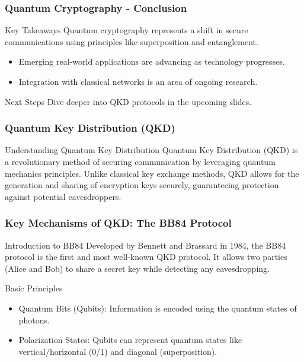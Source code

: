 \documentclass{beamer}
\begin{document}
\begin{frame}[fragile]
    \frametitle{Quantum Cryptography - Conclusion}
    \begin{block}{Key Takeaways}
        Quantum cryptography represents a shift in secure communications using principles like superposition and entanglement.
        \begin{itemize}
            \item Emerging real-world applications are advancing as technology progresses.
            \item Integration with classical networks is an area of ongoing research.
        \end{itemize}
    \end{block}
    \begin{block}{Next Steps}
        Dive deeper into QKD protocols in the upcoming slides.
    \end{block}
\end{frame}

\begin{frame}[fragile]
    \frametitle{Quantum Key Distribution (QKD)}
    \begin{block}{Understanding Quantum Key Distribution}
        Quantum Key Distribution (QKD) is a revolutionary method of securing communication by leveraging quantum mechanics principles. Unlike classical key exchange methods, QKD allows for the generation and sharing of encryption keys securely, guaranteeing protection against potential eavesdroppers.
    \end{block}
\end{frame}

\begin{frame}[fragile]
    \frametitle{Key Mechanisms of QKD: The BB84 Protocol}
    \begin{block}{Introduction to BB84}
        Developed by Bennett and Brassard in 1984, the BB84 protocol is the first and most well-known QKD protocol. It allows two parties (Alice and Bob) to share a secret key while detecting any eavesdropping.
    \end{block}
    
    \begin{block}{Basic Principles}
        \begin{itemize}
            \item Quantum Bits (Qubits): Information is encoded using the quantum states of photons.
            \item Polarization States: Qubits can represent quantum states like vertical/horizontal (0/1) and diagonal (superposition).
        \end{itemize}
    \end{block}
\end{frame}
\end{document}
